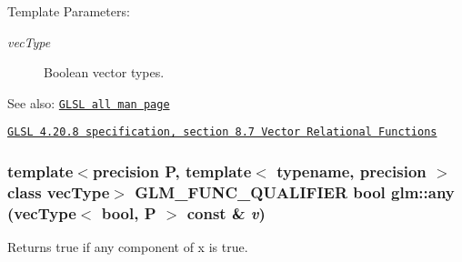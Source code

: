 \begin{Desc}
\item[Template Parameters:]
\begin{description}
\item[{\em vecType}]Boolean vector types.\end{description}
\end{Desc}
\begin{Desc}
\item[See also:]\href{http://www.opengl.org/sdk/docs/manglsl/xhtml/all.xml}{\tt GLSL all man page} 

\href{http://www.opengl.org/registry/doc/GLSLangSpec.4.20.8.pdf}{\tt GLSL 4.20.8 specification, section 8.7 Vector Relational Functions} \end{Desc}
\hypertarget{group__core__func__vector__relational_ge1073be2b9f4c5ffa77eec25400e8121}{
\subsubsection[any]{\setlength{\rightskip}{0pt plus 5cm}template$<$precision P, template$<$ typename, precision $>$ class vecType$>$ GLM\_\-FUNC\_\-QUALIFIER bool glm::any (vecType$<$ bool, P $>$ const \& {\em v})}}
\label{group__core__func__vector__relational_ge1073be2b9f4c5ffa77eec25400e8121}


Returns true if any component of x is true.

